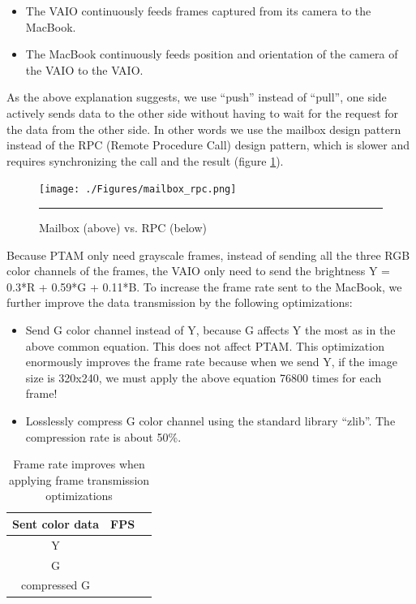 \begin{itemize}
	\item The VAIO continuously feeds frames captured from its camera to the MacBook.
	\item The MacBook continuously feeds position and orientation of the camera of the VAIO to the VAIO.
\end{itemize}

As the above explanation suggests, we use ``push'' instead of ``pull'', one side actively sends data to the other side without having to wait for the request for the data from the other side. In other words we use the mailbox design pattern instead of the RPC (Remote Procedure Call) design pattern, which is slower and requires synchronizing the call and the result (figure \ref{fig:MailboxRPC}).

\begin{figure}[htbp]
	\centering
	\texttt{[image: ./Figures/mailbox\_rpc.png]}
	\rule{35em}{0.5pt}
	\caption[Mailbox vs. RPC]{Mailbox (above) vs. RPC (below)}
	\label{fig:MailboxRPC}
\end{figure}

Because PTAM only need grayscale frames, instead of sending all the three RGB color channels of the frames, the VAIO only need to send the brightness Y = 0.3*R + 0.59*G + 0.11*B. To increase the frame rate sent to the MacBook, we further improve the data transmission by the following optimizations:

\begin{itemize}
	\item Send G color channel instead of Y, because G affects Y the most as in the above common equation. This does not affect PTAM. This optimization enormously improves the frame rate because when we send Y, if the image size is 320x240, we must apply the above equation 76800 times for each frame!
	\item Losslessly compress G color channel using the standard library ``zlib''. The compression rate is about 50\%.
\end{itemize}

\begin{table}[tb]
	\begin{center}
		\begin{tabular}{|c|l|l|}
			\hline
			Sent color data & FPS \\
			\hline
			Y               &     \\
			G               &     \\
			compressed G    &     \\
			\hline
		\end{tabular}
		\caption{Frame rate improves when applying frame transmission optimizations}
	\end{center}
\end{table}

